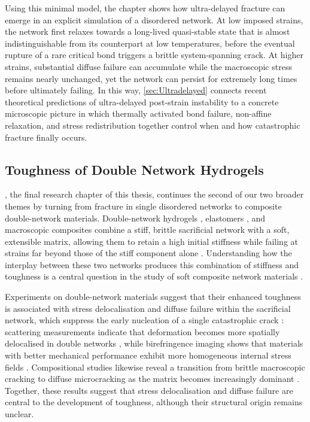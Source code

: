 Using this minimal model, the chapter shows how ultra-delayed fracture can emerge in an explicit simulation of a disordered network. At low imposed strains, the network first relaxes towards a long-lived quasi-stable state that is almost indistinguishable from its counterpart at low temperatures, before the eventual rupture of a rare critical bond triggers a brittle system-spanning crack. At higher strains, substantial diffuse failure can accumulate while the macroscopic stress remains nearly unchanged, yet the network can persist for extremely long times before ultimately failing. In this way, \cref{sec:Ultradelayed} connects recent theoretical predictions of ultra-delayed post-strain instability to a concrete microscopic picture in which thermally activated bond failure, non-affine relaxation, and stress redistribution together control when and how catastrophic fracture finally occurs.

\subsection*{Toughness of Double Network Hydrogels}
, the final research chapter of this thesis, continues the second of our two broader themes by turning from fracture in single disordered networks to composite double-network materials. Double-network hydrogels \cite{gong_why_2010, nakajima_synthesis_2013, sun_highly_2012, xin_effect_2013}, elastomers \cite{ducrot_toughening_2014, millereauMechanicsElastomericMolecular2018}, and macroscopic composites \cite{kingMacroscaleDoubleNetworks2019,takahashiCreatingStiffTough2018} combine a stiff, brittle sacrificial network with a soft, extensible matrix, allowing them to retain a high initial stiffness while failing at strains far beyond those of the stiff component alone \cite{gong_double-network_2003,gong_why_2010,ducrot_toughening_2014,millereauMechanicsElastomericMolecular2018}. Understanding how the interplay between these two networks produces this combination of stiffness and toughness is a central question in the study of soft composite network materials \cite{Creton50th2017,gong_why_2010,kingMacroscaleDoubleNetworks2019,tauber_stretchy_2022}.

Experiments on double-network materials suggest that their enhanced toughness is associated with stress delocalisation and diffuse failure within the sacrificial network, which suppress the early nucleation of a single catastrophic crack \cite{ducrot_structure_2015,huang_importance_2007,zheng_how_2021,fukao_effect_2020,ju_role_nodate}: scattering measurements indicate that deformation becomes more spatially delocalised in double networks \cite{ducrot_structure_2015,tominaga_molecular_2007,Orr2026}, while birefringence imaging shows that materials with better mechanical performance exhibit more homogeneous internal stress fields \cite{gong_double-network_2003,zheng_how_2021}. Compositional studies likewise reveal a transition from brittle macroscopic cracking to diffuse microcracking as the matrix becomes increasingly dominant \cite{fukao_effect_2020,ju_role_nodate,tauber_sharing_2021}. Together, these results suggest that stress delocalisation and diffuse failure are central to the development of toughness, although their structural origin remains unclear.

